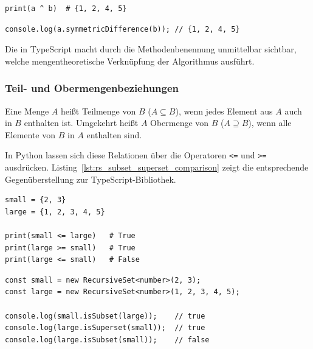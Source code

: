 \begin{listing}[ht]
    \caption{Symmetrische Differenz in Python und mit \texttt{RecursiveSet}}
    \label{lst:rs_symmetric_difference_comparison}
    \begin{verbatim}
print(a ^ b)  # {1, 2, 4, 5}
    \end{verbatim}
    
    
    
    \begin{verbatim}
console.log(a.symmetricDifference(b)); // {1, 2, 4, 5}
    \end{verbatim}
\end{listing}

Die  in TypeScript macht durch die Methodenbenennung unmittelbar sichtbar, welche mengentheoretische Verknüpfung der Algorithmus ausführt.

\subsubsection{Teil- und Obermengenbeziehungen}
\label{subsubsec:rs-api-subset-superset}

Eine Menge \(A\) heißt Teilmenge von \(B\) (\(A \subseteq B\)), wenn jedes Element aus \(A\) auch in \(B\) enthalten ist. Umgekehrt heißt \(A\) Obermenge von \(B\) (\(A \supseteq B\)), wenn alle Elemente von \(B\) in \(A\) enthalten sind.

In Python lassen sich diese Relationen über die Operatoren \texttt{<=} und \texttt{>=} ausdrücken. Listing~\ref{lst:rs_subset_superset_comparison} zeigt die entsprechende Gegenüberstellung zur TypeScript-Bibliothek.

\begin{listing}[ht]
    \caption{Teil- und Obermengenbeziehungen im Sprachvergleich}
    \label{lst:rs_subset_superset_comparison}
    \begin{verbatim}
small = {2, 3}
large = {1, 2, 3, 4, 5}

print(small <= large)   # True
print(large >= small)   # True
print(large <= small)   # False
    \end{verbatim}
    
    
    
    \begin{verbatim}
const small = new RecursiveSet<number>(2, 3);
const large = new RecursiveSet<number>(1, 2, 3, 4, 5);

console.log(small.isSubset(large));    // true
console.log(large.isSuperset(small));  // true
console.log(large.isSubset(small));    // false
    \end{verbatim}
\end{listing}



